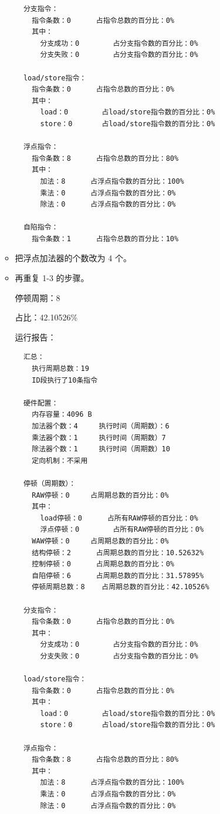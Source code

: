 \documentclass[blue,normal,cn]{elegantnote}
\begin{document}
\begin{enumerate}[wide=0pt, listparindent=2em, parsep=0pt]
\begin{itemize}[leftmargin=3em, listparindent=2em, parsep=0pt]
\begin{lstlisting}
  分支指令：
    指令条数：0		占指令总数的百分比：0%
    其中：
      分支成功：0		占分支指令数的百分比：0%
      分支失败：0		占分支指令数的百分比：0%

  load/store指令：
    指令条数：0		占指令总数的百分比：0%
    其中：
      load：0		占load/store指令数的百分比：0%
      store：0		占load/store指令数的百分比：0%

  浮点指令：
    指令条数：8		占指令总数的百分比：80%
    其中：
      加法：8		占浮点指令数的百分比：100%
      乘法：0		占浮点指令数的百分比：0%
      除法：0		占浮点指令数的百分比：0%

  自陷指令：
    指令条数：1		占指令总数的百分比：10%
\end{lstlisting}

          \item 把浮点加法器的个数改为 4 个。
          \item 再重复 1-3 的步骤。

                \textcolor{ans} {停顿周期：8}

                \textcolor{ans} {占比：42.10526\%}

                \textcolor{ans}{运行报告：}
                \begin{lstlisting}
  汇总：
    执行周期总数：19
    ID段执行了10条指令

  硬件配置：
    内存容量：4096 B
    加法器个数：4		执行时间（周期数）：6
    乘法器个数：1		执行时间（周期数）7		
    除法器个数：1		执行时间（周期数）10		
    定向机制：不采用

  停顿（周期数）：
    RAW停顿：0		占周期总数的百分比：0%
    其中：
      load停顿：0		占所有RAW停顿的百分比：0%
      浮点停顿：0		占所有RAW停顿的百分比：0%
    WAW停顿：0		占周期总数的百分比：0%
    结构停顿：2		占周期总数的百分比：10.52632%
    控制停顿：0		占周期总数的百分比：0%
    自陷停顿：6		占周期总数的百分比：31.57895%
    停顿周期总数：8	占周期总数的百分比：42.10526%

  分支指令：
    指令条数：0		占指令总数的百分比：0%
    其中：
      分支成功：0		占分支指令数的百分比：0%
      分支失败：0		占分支指令数的百分比：0%

  load/store指令：
    指令条数：0		占指令总数的百分比：0%
    其中：
      load：0		占load/store指令数的百分比：0%
      store：0		占load/store指令数的百分比：0%

  浮点指令：
    指令条数：8		占指令总数的百分比：80%
    其中：
      加法：8		占浮点指令数的百分比：100%
      乘法：0		占浮点指令数的百分比：0%
      除法：0		占浮点指令数的百分比：0%


\end{lstlisting}
\end{itemize}
\end{enumerate}
\end{document}
